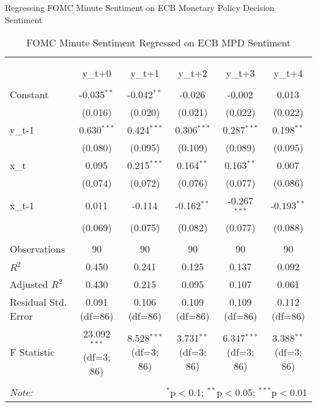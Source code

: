 \documentclass[12pt, letterpaper]{article}
\begin{document}
Regressing FOMC Minute Sentiment on ECB Monetary Policy Decision Sentiment

\begin{table}[H] \centering
  \caption{FOMC Minute Sentiment Regressed on ECB MPD Sentiment}
\begin{tabular}{@{\extracolsep{5pt}}lccccc}
\\[-1.8ex]\hline
\hline \\[-1.8ex]
\\[-1.8ex] & \multicolumn{1}{c}{y_{t+0}} & \multicolumn{1}{c}{y_{t+1}} & \multicolumn{1}{c}{y_{t+2}} & \multicolumn{1}{c}{y_{t+3}} & \multicolumn{1}{c}{y_{t+4}}  \\
\hline \\[-1.8ex]
 Constant & -0.035$^{**}$ & -0.042$^{**}$ & -0.026$^{}$ & -0.002$^{}$ & 0.013$^{}$ \\
& (0.016) & (0.020) & (0.021) & (0.022) & (0.022) \\
 y_{t-1} & 0.630$^{***}$ & 0.424$^{***}$ & 0.306$^{***}$ & 0.287$^{***}$ & 0.198$^{**}$ \\
& (0.080) & (0.095) & (0.109) & (0.089) & (0.095) \\
 x_{t} & 0.095$^{}$ & 0.215$^{***}$ & 0.164$^{**}$ & 0.163$^{**}$ & 0.007$^{}$ \\
& (0.074) & (0.072) & (0.076) & (0.077) & (0.086) \\
 x_{t-1} & 0.011$^{}$ & -0.114$^{}$ & -0.162$^{**}$ & -0.267$^{***}$ & -0.193$^{**}$ \\
& (0.069) & (0.075) & (0.082) & (0.077) & (0.088) \\
\hline \\[-1.8ex]
 Observations & 90 & 90 & 90 & 90 & 90 \\
 $R^2$ & 0.450 & 0.241 & 0.125 & 0.137 & 0.092 \\
 Adjusted $R^2$ & 0.430 & 0.215 & 0.095 & 0.107 & 0.061 \\
 Residual Std. Error & 0.091 (df=86) & 0.106 (df=86) & 0.109 (df=86) & 0.109 (df=86) & 0.112 (df=86) \\
 F Statistic & 23.092$^{***}$ (df=3; 86) & 8.528$^{***}$ (df=3; 86) & 3.731$^{**}$ (df=3; 86) & 6.347$^{***}$ (df=3; 86) & 3.388$^{**}$ (df=3; 86) \\
\hline
\hline \\[-1.8ex]
\textit{Note:} & \multicolumn{5}{r}{$^{*}$p$<$0.1; $^{**}$p$<$0.05; $^{***}$p$<$0.01} \\
\end{tabular}
\end{table}
\end{document}

